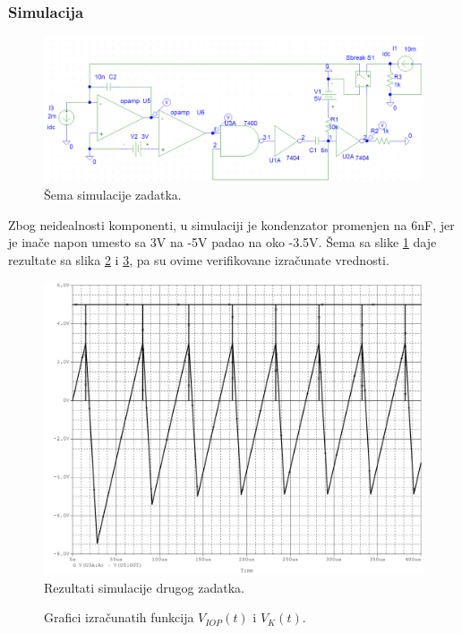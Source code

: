 \documentclass{article}
\begin{document}
                \subsubsection{Simulacija}
                    \begin{figure}[H]
                        \centering
                        \includegraphics[width=\textwidth,height=\textheight,keepaspectratio]{DZ1-2c.png}
                        \caption{Šema simulacije zadatka.}
                        \label{PSpice2c}
                    \end{figure}
                    Zbog neidealnosti komponenti, u simulaciji je kondenzator promenjen na 6nF, jer je inače napon umesto sa 3V na -5V padao na oko -3.5V. Šema sa slike \ref{PSpice2c} daje rezultate sa slika \ref{PSpice2} i \ref{MPL2}, pa su ovime verifikovane izračunate vrednosti.
                    \begin{figure}[H]
                        \centering
                        \includegraphics[width=\textwidth,height=\textheight,keepaspectratio]{DZ1-2.pdf}
                        \caption{Rezultati simulacije drugog zadatka.}
                        \label{PSpice2}
                    \end{figure}
                    \begin{figure}[H]
                        \begin{center}
                            
                        \end{center}
                        \caption{Grafici izračunatih funkcija $V_{IOP}(t)$ i $V_K(t)$.}
                        \label{MPL2}
                    \end{figure}
    
\end{document}
